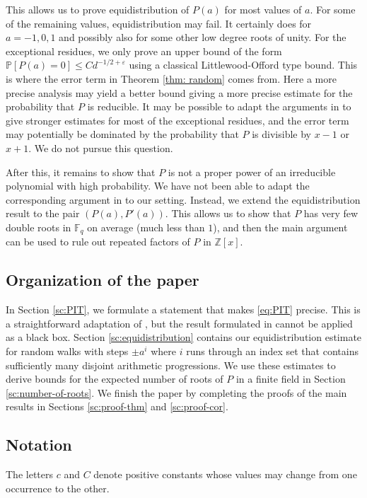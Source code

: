 \documentclass[12pt, notitlepage]{amsart}
\numberwithin{equation}{section}
\def\Z{\mathbb Z}
\def\P{\mathbb P}
\def\F{\mathbb F}
\theoremstyle{remark}
\theoremstyle{definition}
\theoremstyle{remark}
\numberwithin{equation}{section}
\newcommand{\e}{\varepsilon}
\begin{document}
This allows us to prove equidistribution of $P(a)$ for most values of $a$.
For some of the remaining values, equidistribution may fail.
It certainly does for $a=-1,0,1$ and possibly also for some other low degree
roots of unity.
For the exceptional residues, we only prove an upper bound of the form
$\P[P(a)=0]\le C d^{-1/2+\e}$ using a classical Littlewood-Offord type bound.
This is where the error term in Theorem \ref{thm: random} comes from.
Here a more precise analysis may yield a better bound giving a more precise
estimate for the probability that $P$ is reducible.
It may be possible to adapt the arguments in \cite{BV19} to give stronger
estimates for most of the exceptional residues, and the error term
may potentially be dominated by the probability that $P$ is divisible by $x-1$
or $x+1$. 
We do not pursue this question.

After this, it remains to show that $P$ is not a proper power of an irreducible
polynomial with high probability.
We have not been able to adapt the corresponding argument in \cite{BV19}
to our setting.
Instead, we extend the equidistribution result to the pair
$(P(a),P'(a))$.
This allows us to show that $P$ has very few
double roots in $\F_q$ on average (much less than $1$),
and then the main argument can
be used to rule out repeated factors of $P$ in $\Z[x]$.

\subsection{Organization of the paper}

In Section \ref{sc:PIT}, we formulate a statement that makes \eqref{eq:PIT}
precise.
This is a straightforward adaptation of \cite{BV19}, but the result formulated
in \cite{BV19} cannot be applied as a black box.
Section \ref{sc:equidistribution} contains our equidistribution estimate for
random walks with steps $\pm a^i$ where $i$ runs through an index set
that contains sufficiently many disjoint arithmetic progressions.
We use these estimates to derive bounds for the expected number of roots
of $P$ in a finite field in Section \ref{sc:number-of-roots}.
We finish the paper by completing the proofs of the main results in Sections
\ref{sc:proof-thm} and \ref{sc:proof-cor}.

\subsection{Notation}
The letters $c$ and $C$ denote positive constants whose values may change
from one occurrence to the other.
\end{document}
